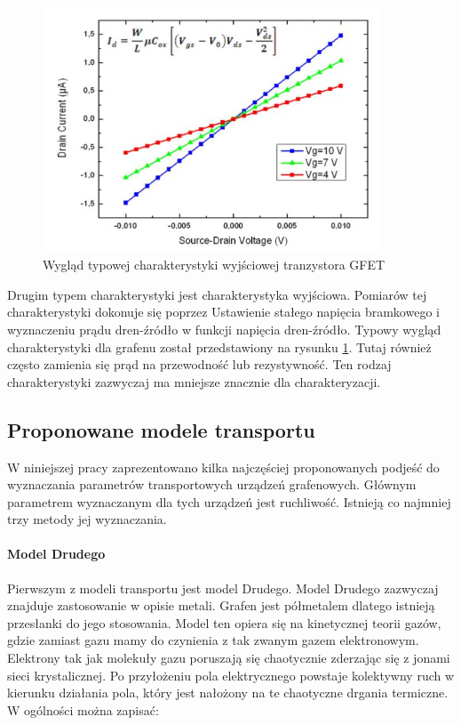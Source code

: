 	\begin{figure}[ht]
	\centering
	\includegraphics[width=0.90\textwidth]{./Rozdzial_3/obrazki/charakterystykaWyj.jpg}
	\caption{Wygląd typowej charakterystyki wyjściowej tranzystora GFET}
	\label{fig:GFET_out} 
	\end{figure}

Drugim typem charakterystyki jest charakterystyka wyjściowa. Pomiarów tej charakterystyki dokonuje się poprzez 
Ustawienie stałego napięcia bramkowego i wyznaczeniu prądu dren-źródło w funkcji napięcia dren-źródło. Typowy wygląd 
charakterystyki dla grafenu został przedstawiony na rysunku \ref{fig:GFET_out}. Tutaj również często zamienia się prąd na
przewodność lub rezystywność. Ten rodzaj charakterystyki zazwyczaj ma mniejsze znacznie dla charakteryzacji.

\subsection{Proponowane modele transportu}
W niniejszej pracy zaprezentowano kilka najczęściej proponowanych podjeść do wyznaczania parametrów transportowych urządzeń
grafenowych. Głównym parametrem wyznaczanym dla tych urządzeń jest ruchliwość. Istnieją co najmniej trzy metody jej 
wyznaczania. 
\paragraph{Model Drudego}

Pierwszym z modeli transportu jest model Drudego. Model Drudego zazwyczaj znajduje zastosowanie w opisie metali. Grafen 
jest półmetalem dlatego istnieją przesłanki do jego stosowania. Model ten opiera się na kinetycznej teorii gazów, gdzie
zamiast gazu mamy do czynienia z tak zwanym gazem elektronowym. Elektrony tak jak molekuły gazu poruszają się chaotycznie
zderzając się z jonami sieci krystalicznej. Po przyłożeniu pola elektrycznego powstaje kolektywny ruch w kierunku działania 
pola, który jest nałożony na te chaotyczne drgania termiczne. 
W ogólności można zapisać:


